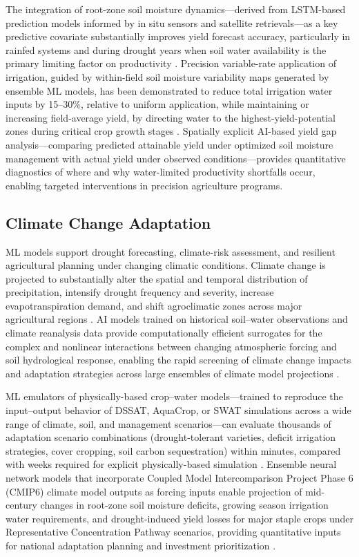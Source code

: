 \documentclass[land,review,accept,pdftex,oneauthor]{Definitions/mdpi}
\begin{document}
The integration of root-zone soil moisture dynamics---derived from LSTM-based prediction models informed by in situ sensors and satellite retrievals---as a key predictive covariate substantially improves yield forecast accuracy, particularly in rainfed systems and during drought years when soil water availability is the primary limiting factor on productivity {\citep{Fang2017}}. Precision variable-rate application of irrigation, guided by within-field soil moisture variability maps generated by ensemble ML models, has been demonstrated to reduce total irrigation water inputs by 15--30\%, relative to uniform application, while maintaining or increasing field-average yield, by directing water to the highest-yield-potential zones during critical crop growth stages \citep{vij2020iot}. Spatially explicit AI-based yield gap analysis---comparing predicted attainable yield under optimized soil moisture management with actual yield under observed conditions---provides quantitative diagnostics of where and why water-limited productivity shortfalls occur, enabling targeted interventions in precision agriculture programs.

\subsection{Climate Change Adaptation}\label{sec5.7}

ML models support drought forecasting, climate-risk assessment, and resilient agricultural planning under changing climatic conditions. Climate change is projected to substantially alter the spatial and temporal distribution of precipitation, intensify drought frequency and severity, increase evapotranspiration demand, and shift agroclimatic zones across major agricultural regions \citep{ipcc2022ar6}. AI models trained on historical soil--water observations and climate reanalysis data provide computationally efficient surrogates for the complex and nonlinear interactions between changing atmospheric forcing and soil hydrological response, enabling the rapid screening of climate change impacts and adaptation strategies across large ensembles of climate model projections \citep{trnka2022soil}.

ML emulators of physically-based crop--water models---trained to reproduce the input--output behavior of DSSAT, AquaCrop, or SWAT simulations across a wide range of climate, soil, and management scenarios---can evaluate thousands of adaptation scenario combinations (drought-tolerant varieties, deficit irrigation strategies, cover cropping, soil carbon sequestration) within minutes, compared with weeks required for explicit physically-based simulation \citep{Meng}. Ensemble neural network models that incorporate {Coupled Model Intercomparison Project Phase 6 (}CMIP6{)} climate model outputs as forcing inputs {enable projection of} mid-century changes in root-zone soil moisture deficits, growing season irrigation water requirements, and drought-induced yield losses for major staple crops under Representative Concentration Pathway scenarios, providing quantitative inputs for national adaptation planning and investment prioritization \citep{trnka2022soil}.
\end{document}
